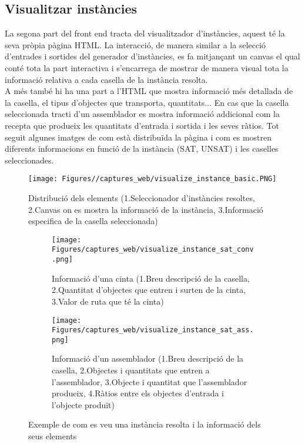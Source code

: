 \subsection{Visualitzar instàncies}
La segona part del front end tracta del visualitzador d'instàncies, aquest té la seva pròpia pàgina HTML. La interacció, de manera similar a la selecció d'entrades i sortides del generador d'instàncies, es fa mitjançant un canvas el qual conté tota la part interactiva i s'encarrega de mostrar de manera visual tota la informació relativa a cada casella de la instància resolta.\\
A més també hi ha una part a l'HTML que mostra informació més detallada de la casella, el tipus d'objectes que transporta, quantitats... En cas que la casella seleccionada tracti d'un assemblador es mostra informació addicional com la recepta que produeix les quantitats d'entrada i sortida i les seves ràtios. Tot seguit algunes imatges de com està distribuïda la pàgina i com es mostren diferents informacions en funció de la instància (SAT, UNSAT) i les caselles seleccionades.

\begin{figure}[H]
    \centering
    \texttt{[image: Figures//captures\_web/visualize\_instance\_basic.PNG]}
    \caption{Distribució dels elements (1.Seleccionador d'instàncies resoltes, 2.Canvas on es mostra la informació de la instància, 3.Informació especifica de la casella seleccionada)}
    \label{fig:visualize_basic}
\end{figure}


\begin{figure}[H]
    \centering
    \begin{subfigure}{0.45\textwidth}
        \texttt{[image: Figures/captures\_web/visualize\_instance\_sat\_conv.png]}
        \caption{Informació d'una cinta (1.Breu descripció de la casella, 2.Quantitat d'objectes que entren i surten de la cinta, 3.Valor de ruta que té la cinta)}
    \end{subfigure}
    \hfill
    \begin{subfigure}{0.45\textwidth}
        \texttt{[image: Figures/captures\_web/visualize\_instance\_sat\_ass.png]}
        \caption{Informació d'un assemblador (1.Breu descripció de la casella, 2.Objectes i quantitats que entren a l'assemblador, 3.Objecte i quantitat que l'assemblador produeix, 4.Ràtios entre els objectes d'entrada i l'objecte produït)}
    \end{subfigure}
    \caption{Exemple de com es veu una instància resolta i la informació dels seus elements}
\end{figure}

